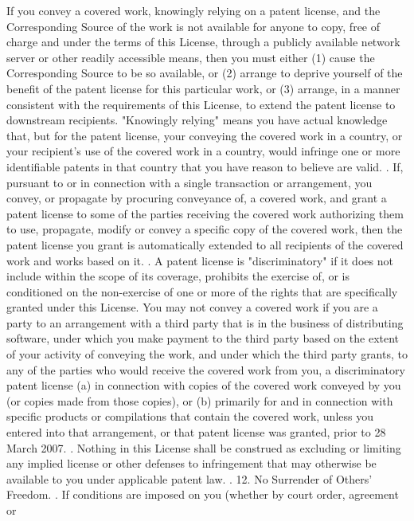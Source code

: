 \begin{script}
   If you convey a covered work, knowingly relying on a patent license,
 and the Corresponding Source of the work is not available for anyone
 to copy, free of charge and under the terms of this License, through a
 publicly available network server or other readily accessible means,
 then you must either (1) cause the Corresponding Source to be so
 available, or (2) arrange to deprive yourself of the benefit of the
 patent license for this particular work, or (3) arrange, in a manner
 consistent with the requirements of this License, to extend the patent
 license to downstream recipients.  "Knowingly relying" means you have
 actual knowledge that, but for the patent license, your conveying the
 covered work in a country, or your recipient's use of the covered work
 in a country, would infringe one or more identifiable patents in that
 country that you have reason to believe are valid.
 .
   If, pursuant to or in connection with a single transaction or
 arrangement, you convey, or propagate by procuring conveyance of, a
 covered work, and grant a patent license to some of the parties
 receiving the covered work authorizing them to use, propagate, modify
 or convey a specific copy of the covered work, then the patent license
 you grant is automatically extended to all recipients of the covered
 work and works based on it.
 .
   A patent license is "discriminatory" if it does not include within
 the scope of its coverage, prohibits the exercise of, or is
 conditioned on the non-exercise of one or more of the rights that are
 specifically granted under this License.  You may not convey a covered
 work if you are a party to an arrangement with a third party that is
 in the business of distributing software, under which you make payment
 to the third party based on the extent of your activity of conveying
 the work, and under which the third party grants, to any of the
 parties who would receive the covered work from you, a discriminatory
 patent license (a) in connection with copies of the covered work
 conveyed by you (or copies made from those copies), or (b) primarily
 for and in connection with specific products or compilations that
 contain the covered work, unless you entered into that arrangement,
 or that patent license was granted, prior to 28 March 2007.
 .
   Nothing in this License shall be construed as excluding or limiting
 any implied license or other defenses to infringement that may
 otherwise be available to you under applicable patent law.
 .
   12. No Surrender of Others' Freedom.
 .
   If conditions are imposed on you (whether by court order, agreement or

\end{script}
